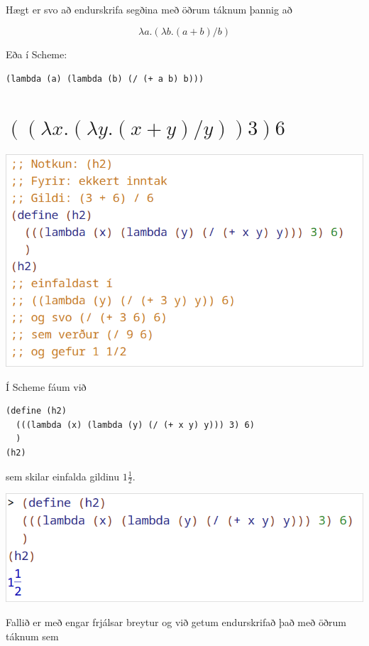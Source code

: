 \documentclass{article}
\begin{document}
	Hægt er svo að endurskrifa segðina með öðrum táknum þannig að 

	\[\lambda a.(\lambda b.(a + b) / b)\]

	Eða í Scheme:

	\begin{center}
		\texttt{(lambda (a) (lambda (b) (/ (+ a b) b)))}
	\end{center}

	\section{$((\lambda x.(\lambda y.(x + y) / y)) 3) 6$}
	\includegraphics[scale=0.3]{h2.png}

	Í Scheme fáum við 

	\begin{verbatim}
(define (h2)
  (((lambda (x) (lambda (y) (/ (+ x y) y))) 3) 6)
  )
(h2)
	\end{verbatim}
	\vspace{-1em}
	sem skilar einfalda gildinu $1\frac{1}{2}$.

	\begin{center}
	\includegraphics[scale=0.375]{36.png}
	\end{center}

	Fallið er með engar frjálsar 
	breytur og við getum endurskrifað það með öðrum táknum sem
\end{document}
